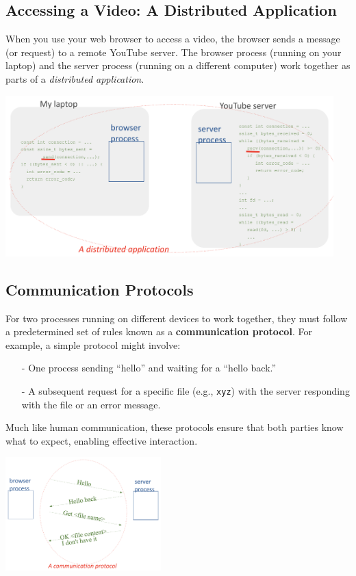 \subsection{Accessing a Video: A Distributed Application}

When you use your web browser to access a video, the browser sends a message (or request) to a remote YouTube server. The browser process (running on your laptop) and the server process (running on a different computer) work together as parts of a \emph{distributed application}. 
\begin{center}
  \includegraphics[width=0.95\textwidth]{chapters/L1/images/distributed.png}
\end{center}

\newpage
\subsection{Communication Protocols}
For two processes running on different devices to work together, they must follow a predetermined set of rules known as a \textbf{communication protocol}. For example, a simple protocol might involve:
\begin{itemize}
  \item[-] One process sending “hello” and waiting for a “hello back.”
  \item[-] A subsequent request for a specific file (e.g., \texttt{xyz}) with the server responding with the file or an error message.
\end{itemize}
Much like human communication, these protocols ensure that both parties know what to expect, enabling effective interaction.

\begin{center}
  \includegraphics[width=0.45\textwidth]{chapters/L1/images/comm_prot.png}
\end{center}


